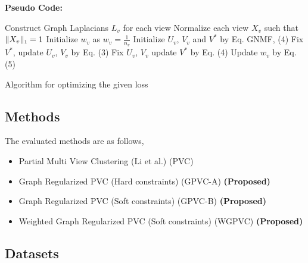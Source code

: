 \documentclass[a4paper]{article}
\begin{document}
	\noindent
	\textbf{Pseudo Code:}	
	\begin{algorithm}
		Construct Graph Laplacians $L_{v}$ for each view\;
		Normalize each view $X_{v}$ such that $\|X_{v}\|_{\text{\tiny1}} = 1 $\;
		Initialize $w_{v}$ as $w_{v}=${\tiny{${\frac{1}{n_{v}}}$}}\;
		Initialize  $U_{v}$, $V_{v}$ and $V^{*}$ by Eq. GNMF, (4)\;
		{
			{
				{
					Fix $V^{*}$, update $U_{v}$, $V_{v}$ by Eq. (3)\;
				}
			}
			Fix $U_{v}$, $V_{v}$ update $V^{*}$ by Eq. (4)\;		
			Update $w_{v}$ by Eq. (5)\;
		}						
		\caption{Algorithm for optimizing the given loss}
	\end{algorithm}

	\subsection{Methods}
	
	The evaluated methods are as follows,
	\begin{itemize}
	\item {Partial Multi View Clustering (Li et al.) (PVC)}
	\item {Graph Regularized PVC (Hard constraints) (GPVC-A)	\small\textbf{(Proposed)}}
	\item {Graph Regularized PVC (Soft constraints) (GPVC-B)	\small\textbf{(Proposed)}}
	\item {Weighted Graph Regularized PVC (Soft constraints) (WGPVC)	\small\textbf{(Proposed)}}
	\end{itemize}

	\subsection{Datasets}
	
\end{document}
